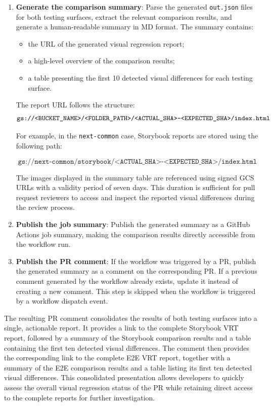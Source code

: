 \begin{enumerate}
    \item \textbf{Generate the comparison summary}: Parse the generated
    \texttt{out.json} files for both testing surfaces, extract the relevant
    comparison results, and generate a human-readable summary in \acs{MD} format.
    The summary contains:

    \begin{itemize}
        \item the URL of the generated visual regression report;
        \item a high-level overview of the comparison results;
        \item a table presenting the first 10 detected visual differences for each
        testing surface.
    \end{itemize}

    The report URL follows the structure:
    \[
        \texttt{\allowbreak gs://<BUCKET\_NAME>/<FOLDER\_PATH>/\allowbreak<ACTUAL\_SHA>-<EXPECTED\_SHA>}
        \\ \allowbreak
        \texttt{/index.html}
    \]

    For example, in the \texttt{next-common} case, Storybook reports are stored
    using the following path:
    
    \[
        \texttt{gs://next-common/storybook/<ACTUAL\_SHA>-<EXPECTED\_SHA>/index.html}
    \]

    The images displayed in the summary table are referenced using signed
    \acs{GCS} URLs with a validity period of seven days. This duration is
    sufficient for pull request reviewers to access and inspect the reported
    visual differences during the review process.

    \item \textbf{Publish the job summary}: Publish the generated summary as a GitHub Actions job summary, making the comparison results directly accessible from the workflow run.

    \item \textbf{Publish the PR comment}: If the workflow was triggered by a \ac{PR}, publish the generated summary as a comment on the corresponding PR. If a previous comment generated by the workflow already exists, update it instead of creating a new comment. This step is skipped when the workflow is triggered by a workflow dispatch event.
\end{enumerate}

The resulting \ac{PR} comment consolidates the results of both testing surfaces into a single, actionable report. It provides a link to the complete Storybook \ac{VRT} report, followed by a summary of the Storybook comparison results and a table containing the first ten detected visual differences. The comment then provides the corresponding link to the complete E2E \ac{VRT} report, together with a summary of the E2E comparison results and a table listing its first ten detected visual differences. This consolidated presentation allows developers to quickly assess the overall visual regression status of the \ac{PR} while retaining direct access to the complete reports for further investigation.

